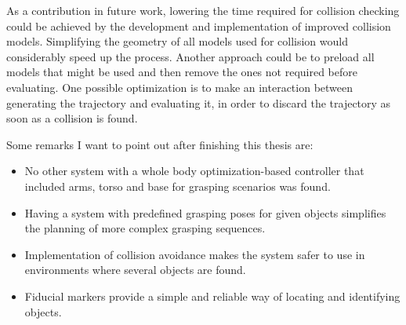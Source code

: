 As a contribution in future work, lowering the time required for collision checking could be achieved by the development and implementation of improved collision models. Simplifying the geometry of all models used for collision would considerably speed up the process. Another approach could be to preload all models that might be used and then remove the ones not required before evaluating. One possible optimization is to make an interaction between generating the trajectory and evaluating it, in order to discard the trajectory as soon as a collision is found.

Some remarks I want to point out after finishing this thesis are:
\begin{itemize}
	\item No other system with a whole body optimization-based controller that included arms, torso and base for grasping scenarios was found.
	\item Having a system with predefined grasping poses for given objects simplifies the planning of more complex grasping sequences.
	\item Implementation of collision avoidance makes the system safer to use in environments where several objects are found.
	\item Fiducial markers provide a simple and reliable way of locating and identifying objects.
\end{itemize}

